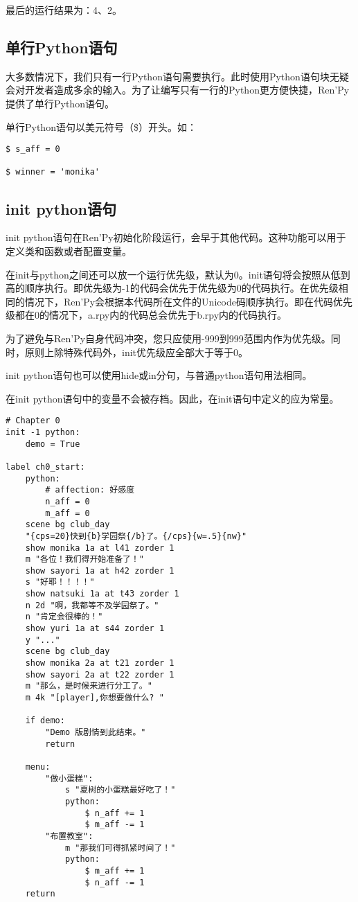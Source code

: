\documentclass[../../Main.tex]{subfiles}
\begin{document}
最后的运行结果为：4、2。

\subsection{单行Python语句}
大多数情况下，我们只有一行Python语句需要执行。此时使用Python语句块无疑会对开发者造成多余的输入。为了让编写只有一行的Python更方便快捷，Ren'Py提供了单行Python语句。

单行Python语句以美元符号（\$）开头。如：
\begin{lstlisting}
$ s_aff = 0

$ winner = 'monika'
\end{lstlisting}

\subsection{init python语句}
init python语句在Ren'Py初始化阶段运行，会早于其他代码。这种功能可以用于定义类和函数或者配置变量。
\begin{ExtraKnowledge}
    在init与python之间还可以放一个运行优先级，默认为0。init语句将会按照从低到高的顺序执行。即优先级为-1的代码会优先于优先级为0的代码执行。在优先级相同的情况下，Ren'Py会根据本代码所在文件的Unicode码顺序执行。即在代码优先级都在0的情况下，a.rpy内的代码总会优先于b.rpy内的代码执行。
\end{ExtraKnowledge}

\begin{Attention}
    为了避免与Ren'Py自身代码冲突，您只应使用-999到999范围内作为优先级。同时，原则上除特殊代码外，init优先级应全部大于等于0。
\end{Attention}

init python语句也可以使用hide或in分句，与普通python语句用法相同。

在init python语句中的变量不会被存档。因此，在init语句中定义的应为常量。

\begin{lstlisting}
# Chapter 0
init -1 python:
    demo = True

label ch0_start:
    python:
        # affection: 好感度
        n_aff = 0
        m_aff = 0
    scene bg club_day
    "{cps=20}快到{b}学园祭{/b}了。{/cps}{w=.5}{nw}"
    show monika 1a at l41 zorder 1
    m "各位！我们得开始准备了！"
    show sayori 1a at h42 zorder 1
    s "好耶！！！！"
    show natsuki 1a at t43 zorder 1
    n 2d "啊，我都等不及学园祭了。"
    n "肯定会很棒的！"
    show yuri 1a at s44 zorder 1
    y "..."
    scene bg club_day
    show monika 2a at t21 zorder 1
    show sayori 2a at t22 zorder 1
    m "那么，是时候来进行分工了。"
    m 4k "[player],你想要做什么? "

    if demo:
        "Demo 版剧情到此结束。"
        return

    menu:
        "做小蛋糕":
            s "夏树的小蛋糕最好吃了！"
            python:
                $ n_aff += 1
                $ m_aff -= 1
        "布置教室":
            m "那我们可得抓紧时间了！"
            python:
                $ m_aff += 1
                $ n_aff -= 1
    return

\end{lstlisting}
\end{document}
